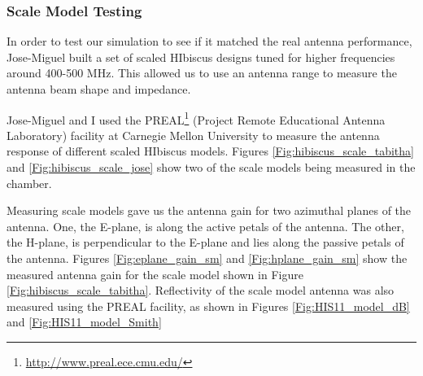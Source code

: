\subsubsection{Scale Model Testing}

In order to test our simulation to see if it matched the real antenna performance, Jose-Miguel built a set of scaled HIbiscus designs tuned for higher frequencies around 400-500 MHz. This allowed us to use an antenna range to measure the antenna beam shape and impedance. 

Jose-Miguel and I used the PREAL\footnote{\url{http://www.preal.ece.cmu.edu/}} (Project Remote Educational Antenna Laboratory) facility at Carnegie Mellon University to measure the antenna response of different scaled HIbiscus models. Figures \ref{Fig:hibiscus_scale_tabitha} and \ref{Fig:hibiscus_scale_jose} show two of the scale models being measured in the chamber.

Measuring scale models gave us the antenna gain for two azimuthal planes of the antenna. One, the E-plane, is along the active petals of the antenna. The other, the H-plane, is perpendicular to the E-plane and lies along the passive petals of the antenna. Figures \ref{Fig:eplane_gain_sm} and \ref{Fig:hplane_gain_sm} show the measured antenna gain for the scale model shown in Figure \ref{Fig:hibiscus_scale_tabitha}. Reflectivity of the scale model antenna was also measured using the PREAL facility, as shown in Figures \ref{Fig:HIS11_model_dB} and \ref{Fig:HIS11_model_Smith}

